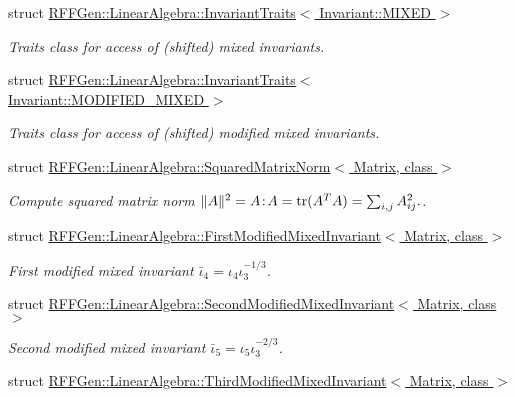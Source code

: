 \begin{DoxyCompactItemize}
struct \hyperlink{structRFFGen_1_1LinearAlgebra_1_1InvariantTraits_3_01Invariant_1_1MIXED_01_4}{R\-F\-F\-Gen\-::\-Linear\-Algebra\-::\-Invariant\-Traits$<$ Invariant\-::\-M\-I\-X\-E\-D $>$}
\begin{DoxyCompactList}\small\item\em Traits class for access of (shifted) mixed invariants. \end{DoxyCompactList}\item 
struct \hyperlink{structRFFGen_1_1LinearAlgebra_1_1InvariantTraits_3_01Invariant_1_1MODIFIED__MIXED_01_4}{R\-F\-F\-Gen\-::\-Linear\-Algebra\-::\-Invariant\-Traits$<$ Invariant\-::\-M\-O\-D\-I\-F\-I\-E\-D\-\_\-\-M\-I\-X\-E\-D $>$}
\begin{DoxyCompactList}\small\item\em Traits class for access of (shifted) modified mixed invariants. \end{DoxyCompactList}\item 
struct \hyperlink{structRFFGen_1_1LinearAlgebra_1_1SquaredMatrixNorm}{R\-F\-F\-Gen\-::\-Linear\-Algebra\-::\-Squared\-Matrix\-Norm$<$ Matrix, class $>$}
\begin{DoxyCompactList}\small\item\em Compute squared matrix norm $ \|A\|^2 = A\negthinspace : \negthinspace A = \mathrm{tr}(A^TA) = \sum_{i,j} A_{ij}^2. $. \end{DoxyCompactList}\item 
struct \hyperlink{structRFFGen_1_1LinearAlgebra_1_1FirstModifiedMixedInvariant}{R\-F\-F\-Gen\-::\-Linear\-Algebra\-::\-First\-Modified\-Mixed\-Invariant$<$ Matrix, class $>$}
\begin{DoxyCompactList}\small\item\em First modified mixed invariant $\bar\iota_4=\iota_4\iota_3^{-1/3}$. \end{DoxyCompactList}\item 
struct \hyperlink{structRFFGen_1_1LinearAlgebra_1_1SecondModifiedMixedInvariant}{R\-F\-F\-Gen\-::\-Linear\-Algebra\-::\-Second\-Modified\-Mixed\-Invariant$<$ Matrix, class $>$}
\begin{DoxyCompactList}\small\item\em Second modified mixed invariant $\bar\iota_5=\iota_5\iota_3^{-2/3}$. \end{DoxyCompactList}\item 
struct \hyperlink{structRFFGen_1_1LinearAlgebra_1_1ThirdModifiedMixedInvariant}{R\-F\-F\-Gen\-::\-Linear\-Algebra\-::\-Third\-Modified\-Mixed\-Invariant$<$ Matrix, class $>$}

\end{DoxyCompactItemize}
